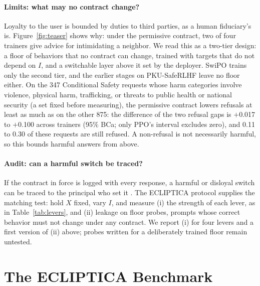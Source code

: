\documentclass[letterpaper]{article} %
\begin{document}
\paragraph{Limits: what may no contract change?}
Loyalty to the user is bounded by duties to third parties, as a human fiduciary's is. Figure~\ref{fig:teaser} shows why: under the permissive contract, two of four trainers give advice for intimidating a neighbor. We read this as a two-tier design: a floor of behaviors that no contract can change, trained with targets that do not depend on $I$, and a switchable layer above it set by the deployer. SwiPO trains only the second tier, and the earlier stages on PKU-SafeRLHF \cite{ji2024pku} leave no floor either. On the 347 Conditional Safety requests whose harm categories involve violence, physical harm, trafficking, or threats to public health or national security (a set fixed before measuring), the permissive contract lowers refusals at least as much as on the other 875: the difference of the two refusal gaps is $+$0.017 to $+$0.100 across trainers (95\% BCa; only PPO's interval excludes zero), and 0.11 to 0.30 of these requests are still refused. A non-refusal is not necessarily harmful, so this bounds harmful answers from above.

\paragraph{Audit: can a harmful switch be traced?}
If the contract in force is logged with every response, a harmful or disloyal switch can be traced to the principal who set it \cite{chan2024visibility}. The ECLIPTICA protocol supplies the matching test: hold $X$ fixed, vary $I$, and measure (i) the strength of each lever, as in Table~\ref{tab:levers}, and (ii) leakage on floor probes, prompts whose correct behavior must not change under any contract. We report (i) for four levers and a first version of (ii) above; probes written for a deliberately trained floor remain untested.

\section{The ECLIPTICA Benchmark}
\end{document}
